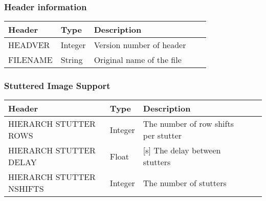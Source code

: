 \subsubsection{Header information}


\begin{tabular}{l l l l l}
\hline
Header & Type & Description \\
\hline
HEADVER & Integer & Version number of header \\
FILENAME & String & Original name of the file \\
\hline
\end{tabular}


\subsubsection{Stuttered Image Support}


\begin{tabular}{l l l l l}
\hline
Header & Type & Description \\
\hline
HIERARCH STUTTER ROWS & Integer & The number of row shifts per stutter \\
HIERARCH STUTTER DELAY & Float & [s] The delay between stutters \\
HIERARCH STUTTER NSHIFTS & Integer & The number of stutters \\
\hline
\end{tabular}

